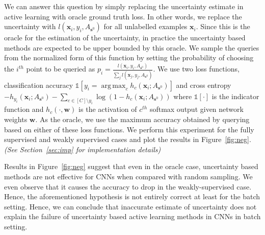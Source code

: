 \documentclass{article}
\DeclareMathOperator*{\argmax}{arg\,max}
\begin{document}
We can answer this question by simply replacing the uncertainty estimate in active learning with oracle ground truth loss. In other words, we replace the uncertainty with $l(\mathbf{x}_i,y_i,A_{\mathbf{s}^0})$ for all unlabelled examples $\mathbf{x}_i$. Since this is the oracle for the estimation of the uncertainty, in practice the uncertainty based methods are expected to be upper bounded by this oracle. We sample the queries from the normalized form of this function by setting the probability of choosing the $i^{th}$ point to be queried as $p_i=\frac{l(\mathbf{x}_i,y_i,A_{\mathbf{s}^0})}{\sum_j l(\mathbf{x}_j,y_j,A_{\mathbf{s}^0})}$. We use two loss functions, classification accuracy \mbox{$\mathds{1}[y_i = \argmax_c h_c(\mathbf{x}_i;A_{\mathbf{s}^0})]$} and cross entropy \mbox{$ - h_{y_i}(\mathbf{x}_i;A_{\mathbf{s}^0}) -\sum_{c \in [C] \setminus y_i} \log(1-  h_{c}(\mathbf{x}_i;A_{\mathbf{s}^0}))$} where $\mathds{1}[\cdot]$ is the indicator function and $h_c(\cdot,\mathbf{w})$ is the activation of $c^{th}$ softmax output given network weights $\mathbf{w}$. As the oracle, we use the maximum accuracy obtained by querying based on either of these loss functions. We perform this experiment for the fully supervised and weakly supervised cases and plot the results in Figure~\ref{fig:neg}. \emph{(See Section~\ref{sec:imp} for implementation details)}

Results in Figure~\ref{fig:neg} suggest that even in the oracle case, uncertainty based methods are not effective for CNNs when compared with random sampling. We even observe that it causes the accuracy to drop in the weakly-supervised case. Hence, the aforementioned hypothesis is not entirely correct at least for the batch setting. Hence, we can conclude that inaccurate estimate of uncertainty does not explain the failure of uncertainty based active learning methods in CNNs in batch setting. 
\end{document}
